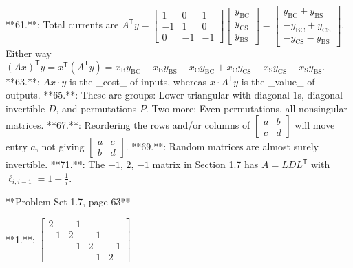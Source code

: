 

**61.**: Total currents are \(A^{\mathsf{T}}y=\begin{bmatrix}1&0&1\\ -1&1&0\\ 0&-1&-1\end{bmatrix}\begin{bmatrix}y_{\text{BC}}\\ y_{\text{CS}}\\ y_{\text{BS}}\end{bmatrix}=\begin{bmatrix}y_{\text{BC}}+y_{\text{BS}}\\ -y_{\text{BC}}+y_{\text{CS}}\\ -y_{\text{CS}}-y_{\text{BS}}\end{bmatrix}.\) Either way \((Ax)^{\mathsf{T}}y=x^{\mathsf{T}}(A^{\mathsf{T}}y)=x_{\text{B}}y_{\text{BC}}+x_ {\text{B}}y_{\text{BS}}-x_{\text{C}}y_{\text{BC}}+x_{\text{C}}y_{\text{CS}}-x_ {\text{S}}y_{\text{CS}}-x_{\text{S}}y_{\text{BS}}.\)
**63.**: \(Ax\cdot y\) is the _cost_ of inputs, whereas \(x\cdot A^{\mathsf{T}}y\) is the _value_ of outputs.
**65.**: These are groups: Lower triangular with diagonal \(1\)s, diagonal invertible \(D\), and permutations \(P\). Two more: Even permutations, all nonsingular matrices.
**67.**: Reordering the rows and/or columns of \(\begin{bmatrix}a&b\\ c&d\end{bmatrix}\) will move entry \(a\), not giving \(\begin{bmatrix}a&c\\ b&d\end{bmatrix}\).
**69.**: Random matrices are almost surely invertible.
**71.**: The \(-1\), \(2\), \(-1\) matrix in Section 1.7 has \(A=LDL^{\mathsf{T}}\) with \(\ell_{i,i-1}=1-\frac{1}{i}\).

**Problem Set 1.7, page 63**

**1.**: \(\begin{bmatrix}2&-1\\ -1&2&-1\\ &-1&2&-1\\ &&-1&2\end{bmatrix}\)

